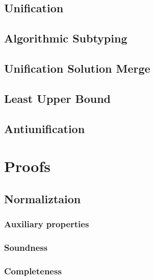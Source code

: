 \documentclass[a4,natbib=false]{article}
\begin{document}

\subsection{Unification}
\ottdefnsU

\subsection{Algorithmic Subtyping}
\ottdefnsA

\subsection{Unification Solution Merge}
\ottdefnsSM

\subsection{Least Upper Bound}
\ottdefnsLUB

\subsection{Antiunification}
\ottdefnsAU

\section{Proofs}




\subsection{Normaliztaion}

\subsubsection{Auxiliary properties}


\subsubsection{Soundness}


\subsubsection{Completeness}

\end{document}
